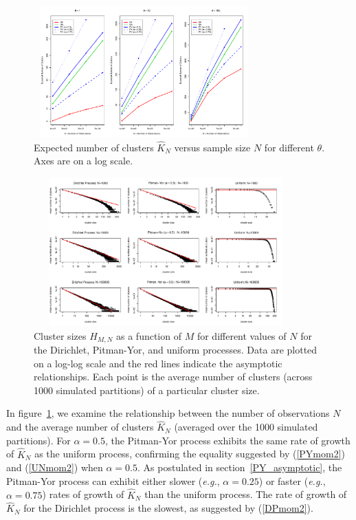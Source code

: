 \documentclass[twoside]{article}
\begin{document}
\begin{figure}[t]
\centering
\includegraphics[width=3.35in,height=2in]{figures/fig_number_of_clusters.pdf}
\caption{Expected number of clusters $\hat{K}_N$ versus sample size
  $N$ for different $\theta$. Axes are on a log
  scale.}\label{numberofclusters}
\vspace{-0.4cm}
\end{figure}


\begin{figure}[t]
\centering
\includegraphics[width=4in,height=2.25in]{figures/fig_cluster_sizes.pdf}
\caption{Cluster sizes $H_{M,N}$ as a function of $M$ for different
  values of $N$ for the Dirichlet, Pitman-Yor, and uniform
  processes. Data are plotted on a log-log scale and the red lines
  indicate the asymptotic relationships.  Each point is the average
  number of clusters (across 1000 simulated partitions) of a
  particular cluster size.}\label{simclustersizes}
\vspace{-0.4cm}
\end{figure}

In figure~\ref{numberofclusters}, we examine the relationship between
the number of observations $N$ and the average number of clusters
$\hat{K}_N$ (averaged over the 1000 simulated partitions). For $\alpha
= 0.5$, the Pitman-Yor process exhibits the same rate of growth of
$\hat{K}_N$ as the uniform process, confirming the equality suggested
by (\ref{PYmom2}) and (\ref{UNmom2}) when $\alpha = 0.5$.  As
postulated in section~\ref{PY_asymptotic}, the Pitman-Yor process can
exhibit either slower (\emph{e.g.}, $\alpha=0.25$) or faster
(\emph{e.g.}, $\alpha=0.75$) rates of growth of $\hat{K}_N$ than the
uniform process. The rate of growth of $\hat{K}_N$ for the Dirichlet
process is the slowest, as suggested by (\ref{DPmom2}).
\end{document}
